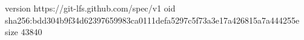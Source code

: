 version https://git-lfs.github.com/spec/v1
oid sha256:bdd304b9f34d62397659983ca0111defa5297c5f73a3e17a426815a7a444255e
size 43840
